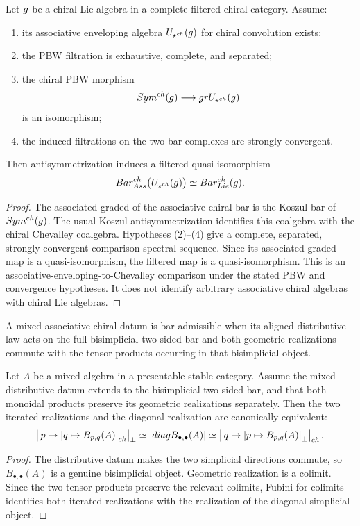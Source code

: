 \begin{theorem}
Let $g$ be a chiral Lie algebra in a complete filtered chiral category.  Assume:
\begin{enumerate}
\item its associative enveloping algebra $U_{\mathbin{\star^{ch}}}(g)$ for chiral convolution exists;
\item the PBW filtration is exhaustive, complete, and separated;
\item the chiral PBW morphism
\[
 Sym^{ch}(g)\longrightarrow gr U_{\mathbin{\star^{ch}}}(g)
\]
is an isomorphism;
\item the induced filtrations on the two bar complexes are strongly convergent.
\end{enumerate}
Then antisymmetrization induces a filtered quasi-isomorphism
\[
 Bar^{ch}_{Ass}\bigl(U_{\mathbin{\star^{ch}}}(g)\bigr)
 \simeq
 Bar^{ch}_{Lie}(g).
\]
\end{theorem}
\begin{proof}
The associated graded of the associative chiral bar is the Koszul bar of $Sym^{ch}(g)$.  The usual Koszul antisymmetrization identifies this coalgebra with the chiral Chevalley coalgebra.  Hypotheses (2)--(4) give a complete, separated, strongly convergent comparison spectral sequence.  Since its associated-graded map is a quasi-isomorphism, the filtered map is a quasi-isomorphism.  This is an associative-enveloping-to-Chevalley comparison under the stated PBW and convergence hypotheses. It does not identify arbitrary associative chiral algebras with chiral Lie algebras.
\end{proof}

\begin{definition}
A mixed associative chiral datum is bar-admissible when its aligned distributive law acts on the full bisimplicial two-sided bar and both geometric realizations commute with the tensor products occurring in that bisimplicial object.
\end{definition}

\begin{theorem}
Let $A$ be a mixed algebra in a presentable stable category.  Assume the mixed distributive datum extends to the bisimplicial two-sided bar, and that both monoidal products preserve its geometric realizations separately.  Then the two iterated realizations and the diagonal realization are canonically equivalent:
\[
 \left|\,p\mapsto\left|q\mapsto B_{p,q}(A)\right|_{ch}\right|_\perp
 \simeq
 \left|diagB_{\bullet,\bullet}(A)\right|
 \simeq
 \left|\,q\mapsto\left|p\mapsto B_{p,q}(A)\right|_\perp\right|_{ch}.
\]
\end{theorem}
\begin{proof}
The distributive datum makes the two simplicial directions commute, so $B_{\bullet,\bullet}(A)$ is a genuine bisimplicial object.  Geometric realization is a colimit.  Since the two tensor products preserve the relevant colimits, Fubini for colimits identifies both iterated realizations with the realization of the diagonal simplicial object.
\end{proof}

